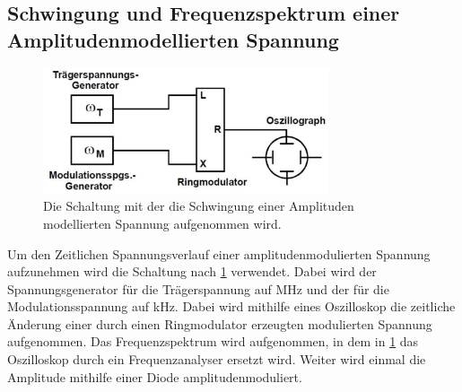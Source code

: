 \subsection{Schwingung und Frequenzspektrum einer Amplitudenmodellierten Spannung}
\begin{figure}[h!]
	\centering
	\includegraphics[width = 0.75\textwidth]{../Grafiken/Versuchsaufbau_a.pdf}
	\caption{Die Schaltung mit der die Schwingung einer Amplituden modellierten Spannung aufgenommen wird.\cite{V59}\label{fig:Aufbau_a}}
\end{figure}
Um den Zeitlichen Spannungsverlauf einer amplitudenmodulierten Spannung aufzunehmen wird die Schaltung nach \cref{fig:Aufbau_a} verwendet.
Dabei wird der Spannungsgenerator für die Trägerspannung auf MHz und der für die Modulationsspannung auf kHz.
Dabei wird mithilfe eines Oszilloskop die zeitliche Änderung einer durch einen Ringmodulator erzeugten modulierten Spannung aufgenommen.
Das Frequenzspektrum wird aufgenommen, in dem in \cref{fig:Aufbau_a} das Oszilloskop durch ein Frequenzanalyser ersetzt wird.
Weiter wird einmal die Amplitude mithilfe einer Diode amplitudenmoduliert.

\newpage
